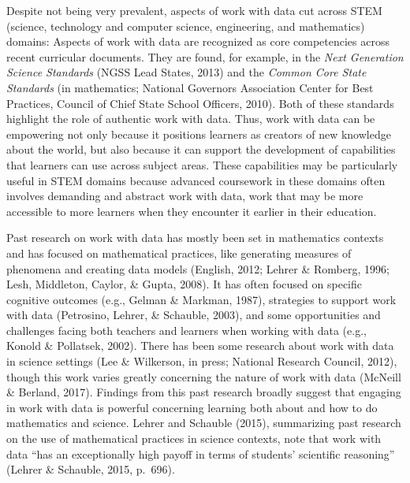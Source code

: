 \documentclass[]{msu-thesis}
\theoremstyle{definition}
\theoremstyle{definition}
\theoremstyle{definition}
\theoremstyle{remark}
\begin{document}
Despite not being very prevalent, aspects of work with data cut across
STEM (science, technology and computer science, engineering, and
mathematics) domains: Aspects of work with data are recognized as core
competencies across recent curricular documents. They are found, for
example, in the \emph{Next Generation Science Standards} (NGSS Lead
States, 2013) and the \emph{Common Core State Standards} (in
mathematics; National Governors Association Center for Best Practices,
Council of Chief State School Officers, 2010). Both of these standards
highlight the role of authentic work with data. Thus, work with data can
be empowering not only because it positions learners as creators of new
knowledge about the world, but also because it can support the
development of capabilities that learners can use across subject areas.
These capabilities may be particularly useful in STEM domains because
advanced coursework in these domains often involves demanding and
abstract work with data, work that may be more accessible to more
learners when they encounter it earlier in their education.

Past research on work with data has mostly been set in mathematics
contexts and has focused on mathematical practices, like generating
measures of phenomena and creating data models (English, 2012; Lehrer \&
Romberg, 1996; Lesh, Middleton, Caylor, \& Gupta, 2008). It has often
focused on specific cognitive outcomes (e.g., Gelman \& Markman, 1987),
strategies to support work with data (Petrosino, Lehrer, \& Schauble,
2003), and some opportunities and challenges facing both teachers and
learners when working with data (e.g., Konold \& Pollatsek, 2002). There
has been some research about work with data in science settings (Lee \&
Wilkerson, in press; National Research Council, 2012), though this work
varies greatly concerning the nature of work with data (McNeill \&
Berland, 2017). Findings from this past research broadly suggest that
engaging in work with data is powerful concerning learning both about
and how to do mathematics and science. Lehrer and Schauble (2015),
summarizing past research on the use of mathematical practices in
science contexts, note that work with data ``has an exceptionally high
payoff in terms of students' scientific reasoning'' (Lehrer \& Schauble,
2015, p.~696).
\end{document}
